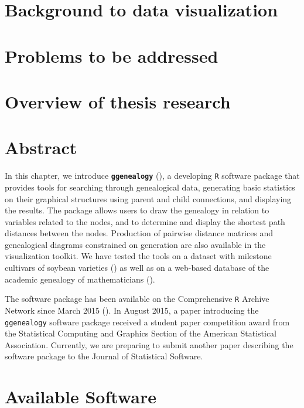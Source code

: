 \documentclass[11pt,a4paper,oldfontcommands,openany]{memoir}
\numberwithin{equation}{section} %
\newcommand{\pkg}[1]{{\texttt{#1}}}
\begin{document}
\section{Background to data visualization}

\lipsum[1]

\section{Problems to be addressed}

\lipsum[2]

\section{Overview of thesis research}
\label{sec:helpSection}

\section{Abstract}

In this chapter, we introduce \textbf{\pkg{ggenealogy}} (\citealt{ggen}), a developing \pkg{R} software package that provides tools for searching through genealogical data, generating basic statistics on their graphical structures using parent and child connections, and displaying the results. The package allows users to draw the genealogy in relation to variables related to the nodes, and to determine and display the shortest path distances between the nodes. Production of pairwise distance matrices and genealogical diagrams constrained on generation are also available in the visualization toolkit. We have tested the tools on a dataset with milestone cultivars of soybean varieties (\citealt{soybean}) as well as on a web-based database of the academic genealogy of mathematicians (\citealt{mgp}).

The software package has been available on the Comprehensive \pkg{R} Archive Network since March 2015 (\citealt{ggen}). In August 2015, a paper introducing the \pkg{ggenealogy} software package received a student paper competition award from the Statistical Computing and Graphics Section of the American Statistical Association. Currently, we are preparing to submit another paper describing the software package to the Journal of Statistical Software.

\section{Available Software}
\end{document}
